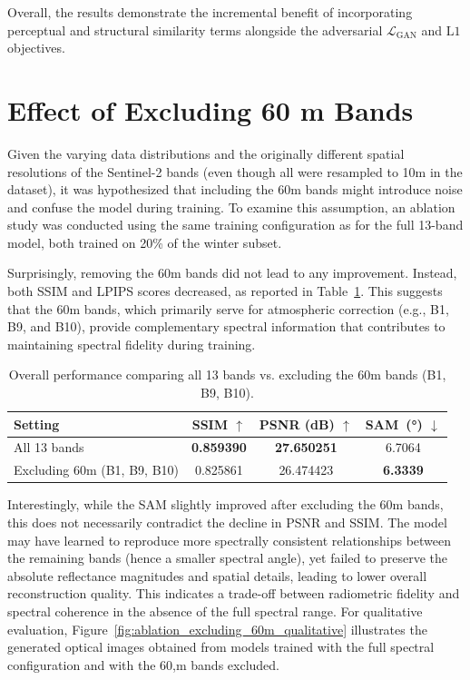 Overall, the results demonstrate the incremental benefit of incorporating perceptual and structural similarity terms alongside the adversarial $\mathcal{L}_{\text{GAN}}$ and $\mathrm{L1}$ objectives. 

\section{Effect of Excluding 60 m Bands}
Given the varying data distributions and the originally different spatial resolutions of the Sentinel-2 bands (even though all were resampled to 10m in the dataset), it was hypothesized that including the 60m bands might introduce noise and confuse the model during training. To examine this assumption, an ablation study was conducted using the same training configuration as for the full 13-band model, both trained on 20\% of the winter subset.

Surprisingly, removing the 60m bands did not lead to any improvement. Instead, both SSIM and LPIPS scores decreased, as reported in Table~\ref{tab:ablation_excluding_60m}. This suggests that the 60m bands, which primarily serve for atmospheric correction (e.g., B1, B9, and B10), provide complementary spectral information that contributes to maintaining spectral fidelity during training.

\begin{table}[!htbp]
    \centering
    \setlength{\tabcolsep}{8pt}
    \renewcommand{\arraystretch}{1.15}
    \caption[Overall performance when excluding 60m bands]{Overall performance comparing all 13 bands vs. excluding the 60m bands (B1, B9, B10).}
    \label{tab:ablation_excluding_60m}
    \begin{tabular}{lccc}
        \hline
        \textbf{Setting} & \textbf{SSIM $\uparrow$} & \textbf{PSNR (dB) $\uparrow$} & \textbf{SAM~(°) $\downarrow$} \\
        \hline
        All 13 bands & \textbf{0.859390} & \textbf{27.650251} & 6.7064 \\
        Excluding 60m (B1, B9, B10) & 0.825861 & 26.474423 & \textbf{6.3339} \\
        \hline
    \end{tabular}
\end{table}

Interestingly, while the SAM slightly improved after excluding the 60m bands, this does not necessarily contradict the decline in PSNR and SSIM. The model may have learned to reproduce more spectrally consistent relationships between the remaining bands (hence a smaller spectral angle), yet failed to preserve the absolute reflectance magnitudes and spatial details, leading to lower overall reconstruction quality. This indicates a trade-off between radiometric fidelity and spectral coherence in the absence of the full spectral range. For qualitative evaluation, Figure~\ref{fig:ablation_excluding_60m_qualitative} illustrates the generated optical images obtained from models trained with the full spectral configuration and with the 60,m bands excluded.

